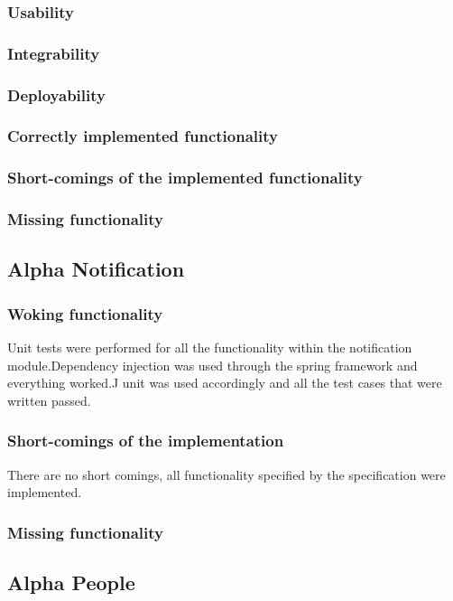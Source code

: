 \documentclass{article}
\begin{document}
        \subsubsection{Usability}
        \subsubsection{Integrability}
        \subsubsection{Deployability}
        \subsubsection{Correctly implemented functionality}
        \subsubsection{Short-comings of the implemented functionality}
        \subsubsection{Missing functionality}
\newpage
\subsection{Alpha Notification}
\subsubsection{Woking functionality}
	Unit tests were performed for all the functionality within the notification module.Dependency injection was used through the spring framework and everything worked.J unit was used accordingly and all the test cases that were written passed.
	
\subsubsection{Short-comings of the implementation}
	There are no short comings, all functionality specified by the specification were implemented.
\subsubsection{Missing functionality}

\subsection{Alpha People}
\end{document}
